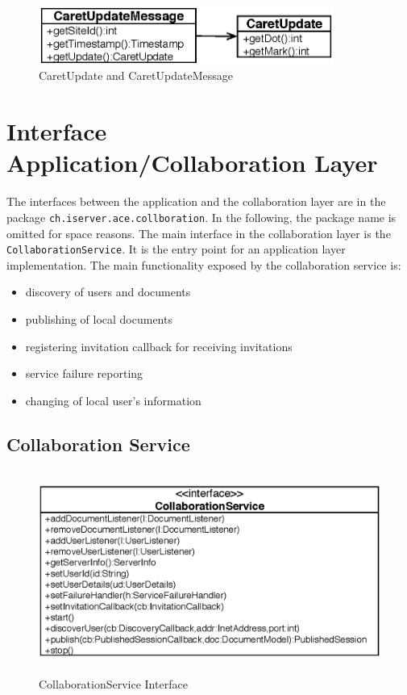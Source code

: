 \begin{figure}[H]
 \centering
 \includegraphics[width=9.7cm,height=1.9cm]{../images/finalreport/collaboration_caretupdate_uml.eps}
 \caption{CaretUpdate and CaretUpdateMessage}
\end{figure}



\section{Interface Application/Collaboration Layer}
The interfaces between the application and the collaboration layer are in
the package \texttt{ch.\-iserver.\-ace.\-collboration}. In the following,
the package name is omitted for space reasons. The main interface in
the collaboration layer is the \texttt{Collaboration\-Service}.
It is the entry point for an application layer implementation. The main 
functionality exposed by the collaboration service is:
\begin{itemize}
 \item discovery of users and documents
 \item publishing of local documents
 \item registering invitation callback for receiving invitations
 \item service failure reporting
 \item changing of local user's information
\end{itemize}


\subsection{Collaboration Service}

\begin{figure}[H]
 \centering
 \includegraphics[width=13.19cm,height=6.63cm]{../images/finalreport/architecture_collaborationservice_uml.eps}
 \caption{CollaborationService Interface}
\end{figure}

